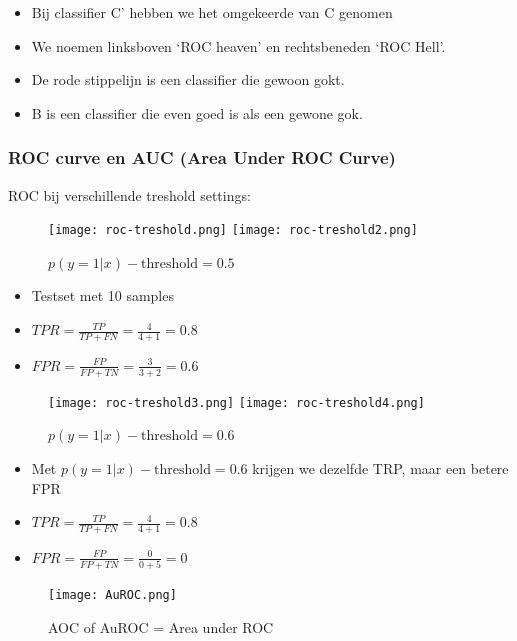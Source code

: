 \documentclass{article}
\begin{document}
\begin{itemize}
    \item Bij classifier C' hebben we het omgekeerde van C genomen
    \item We noemen linksboven `ROC heaven' en rechtsbeneden `ROC Hell'.
    \item De rode stippelijn is een classifier die gewoon gokt.
    \item B is een classifier die even goed is als een gewone gok.
\end{itemize}


\subsubsection{ROC curve en AUC (Area Under ROC Curve)}

ROC bij verschillende treshold settings: 

\begin{figure}[H]
    \centering
    \texttt{[image: roc-treshold.png]}
    \texttt{[image: roc-treshold2.png]}
    \caption{$p(y=1 | x) - \text{threshold} = 0.5$ }
\end{figure}

\begin{itemize}
    \item Testset met 10 samples
    \item $TPR = \frac{TP}{TP + FN} = \frac{4}{4 + 1} = 0.8$
    \item $FPR = \frac{FP}{FP + TN} = \frac{3}{3 + 2} = 0.6$
\end{itemize}

\begin{figure}[H]
    \centering
    \texttt{[image: roc-treshold3.png]}
    \texttt{[image: roc-treshold4.png]}
    \caption{$p(y=1 | x) - \text{threshold} = 0.6$ }
\end{figure}

\begin{itemize}
    \item Met $p(y=1 | x) - \text{threshold} = 0.6$ krijgen we dezelfde TRP, maar een betere FPR
    \item $TPR = \frac{TP}{TP + FN} = \frac{4}{4 + 1} = 0.8$
    \item $FPR = \frac{FP}{FP + TN} = \frac{0}{0 + 5} = 0$
\end{itemize}

\begin{figure}[H]
    \centering
    \texttt{[image: AuROC.png]}
    \caption{AOC of AuROC = Area under ROC}
\end{figure}
\end{document}
